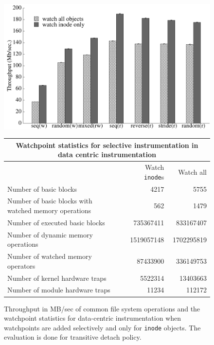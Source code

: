 \begin{figure}[!h]
\begin{center}
\includegraphics[width=6.0in]{thesis_watch_inode.pdf}
\end{center}

\begin{center}
\vspace{1em}
\begin{tabular}{|l|r|r|}
  \hline
  \multicolumn{3}{|c|}{Watchpoint statistics for selective instrumentation in data centric instrumentation }  \\ \hline
  \hline
  & Watch \texttt{inode}s & Watch all \\
  \hline
  Number of basic blocks & 4217 & 5755\\
  Number of basic blocks with watched memory operations & 562 & 1479 \\
  \hline
  Number of executed basic blocks &  735367411 &  833167407 \\
  \hline
  Number of dynamic memory operations & 1519057148 & 1702295819 \\
  \hline
  Number of watched memory operators & 87433900 & 336149753 \\
  \hline
  Number of kernel hardware traps & 5522314 &  13403663 \\
  \hline
  Number of module hardware traps & 11234 & 112172 \\
  \hline
\end{tabular}
\caption[Performance impact of selective instrumentations for data-centric approach.]{\label{fig:watchpoint_inode}Throughput in MB/sec of common file system operations and the watchpoint statistics for data-centric instrumentation when watchpoints are added selectively and only for \texttt{inode} objects. The evaluation is done for transitive detach policy.}
\end{center}
\end{figure}


